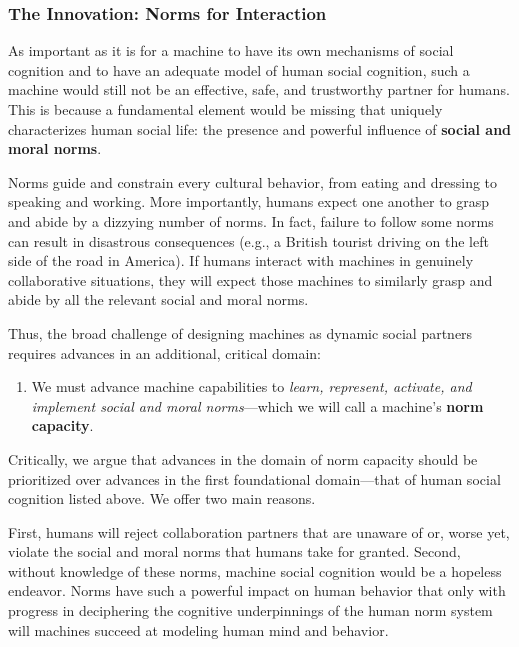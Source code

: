 \documentclass[12pt]{article}
\begin{document}
\subsubsection*{The Innovation: Norms for Interaction}

\noindent As important as it is for a machine to have its own mechanisms of
social cognition and to have an adequate model of human social cognition, 
such a machine would still not be an effective, safe, and trustworthy partner 
for humans.  This is because a fundamental element would be missing that 
uniquely characterizes human social life: the presence and powerful 
influence of {\bf social and moral norms}.

Norms guide and constrain every cultural behavior, from eating and
dressing to speaking and working. More importantly, humans expect one
another to grasp and abide by a dizzying number of norms.  In fact,
failure to follow some norms can result in disastrous consequences
(e.g., a British tourist driving on the left side of the road in
America). If humans interact with machines in genuinely collaborative
situations, they will expect those machines to similarly grasp and
abide by all the relevant social and moral norms.

Thus, the broad challenge of designing machines as dynamic social partners requires advances in an additional, critical domain:

\vspace{-1 mm}
\begin{enumerate}[resume, label= \arabic*., leftmargin=*,align=left]
\item We must advance machine capabilities to {\em learn, represent, activate, and
    implement social and moral norms}---which we will call a machine's
  {\bf norm capacity}.
\end{enumerate}
\vspace{-1 mm}

\noindent Critically, we argue that advances in the domain of norm capacity 
should be prioritized over advances in the first foundational domain---that of 
human social cognition listed above.  We offer two main reasons.

First, humans will reject collaboration partners that are
unaware of or, worse yet, violate the social and moral norms that
humans take for granted.  Second, without knowledge of these norms, machine social cognition would be a hopeless endeavor.  Norms have such a powerful impact on human behavior that only with progress in deciphering the cognitive underpinnings of the human norm system will machines succeed at modeling human mind and behavior.  
\end{document}
